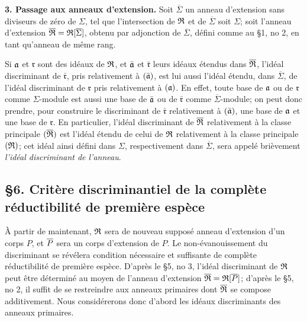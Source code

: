 \textbf{3. Passage aux anneaux d'extension.} Soit $\overline\Sigma$ un anneau d'extension sans diviseurs de zéro de $\Sigma$, tel que l'intersection de $\mathfrak R$ et de $\overline\Sigma$ soit $\Sigma$; soit l'anneau d'extension $\overline{\mathfrak R}=\mathfrak R[\overline\Sigma]$, obtenu par adjonction de $\overline\Sigma$, défini comme au \S 1, no 2, en tant qu'anneau de même rang.

Si $\mathfrak a$ et $\mathfrak r$ sont des idéaux de $\mathfrak R$, et $\bar{\mathfrak a}$ et $\bar{\mathfrak r}$ leurs idéaux étendus dans $\overline{\mathfrak R}$, l'idéal discriminant de $\bar{\mathfrak r}$, pris relativement à $(\bar{\mathfrak a})$, est lui aussi l'idéal étendu, dans $\overline\Sigma$, de l'idéal discriminant de $\mathfrak r$ pris relativement à $(\mathfrak a)$. En effet, toute base de $\mathfrak a$ ou de $\mathfrak r$ comme $\Sigma$-module est aussi une base de $\bar{\mathfrak a}$ ou de $\bar{\mathfrak r}$ comme $\overline\Sigma$-module; on peut donc prendre, pour construire le discriminant de $\bar{\mathfrak r}$ relativement à $(\bar{\mathfrak a})$, une base de $\mathfrak a$ et une base de $\mathfrak r$. En particulier, l'idéal discriminant de $\overline{\mathfrak R}$ relativement à la classe principale $(\overline{\mathfrak R})$ est l'idéal étendu de celui de $\mathfrak R$ relativement à la classe principale $(\mathfrak R)$; cet idéal ainsi défini dans $\Sigma$, respectivement dans $\overline\Sigma$, sera appelé brièvement \emph{l'idéal discriminant de l'anneau}.

\subsection*{\S 6. Critère discriminantiel de la complète réductibilité de première espèce}

À partir de maintenant, $\mathfrak R$ sera de nouveau supposé anneau d'extension d'un corps $P$, et $\overline P$ sera un corps d'extension de $P$. Le non-évanouissement du discriminant se révélera condition nécessaire et suffisante de complète réductibilité de première espèce. D'après le \S 5, no 3, l'idéal discriminant de $\mathfrak R$ peut être déterminé au moyen de l'anneau d'extension $\overline{\mathfrak R}=\mathfrak R[\overline P]$; d'après le \S 5, no 2, il suffit de se restreindre aux anneaux primaires dont $\overline{\mathfrak R}$ se compose additivement. Nous considérerons donc d'abord les idéaux discriminants des anneaux primaires.

